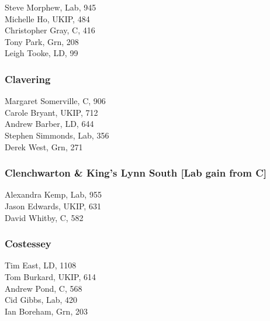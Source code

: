 \documentclass[a4paper,openany,10pt]{book}
\begin{document}


Steve Morphew, Lab, 945\\
Michelle Ho, UKIP, 484\\
Christopher Gray, C, 416\\
Tony Park, Grn, 208\\
Leigh Tooke, LD, 99\\


\subsubsection*{Clavering}



Margaret Somerville, C, 906\\
Carole Bryant, UKIP, 712\\
Andrew Barber, LD, 644\\
Stephen Simmonds, Lab, 356\\
Derek West, Grn, 271\\


\subsubsection*{Clenchwarton \& King's Lynn South \hspace*{\fill}\nolinebreak[1]%
\enspace\hspace*{\fill}
[Lab gain from C]}



Alexandra Kemp, Lab, 955\\
Jason Edwards, UKIP, 631\\
David Whitby, C, 582\\


\subsubsection*{Costessey}



Tim East, LD, 1108\\
Tom Burkard, UKIP, 614\\
Andrew Pond, C, 568\\
Cid Gibbs, Lab, 420\\
Ian Boreham, Grn, 203\\
\end{document}
